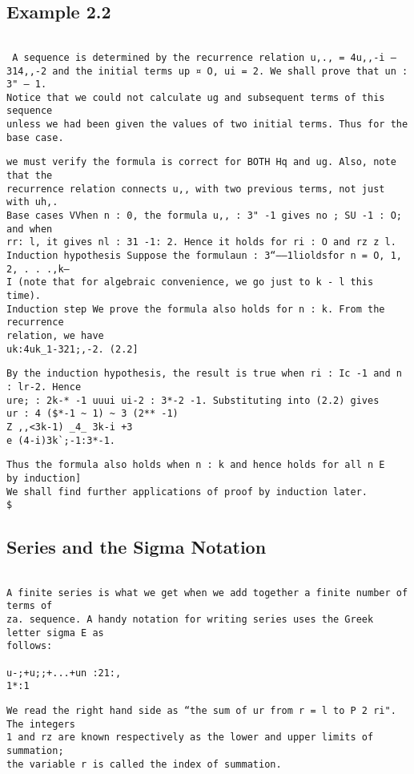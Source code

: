 \documentclass[]{article}
\begin{document}
\subsection*{Example 2.2}
\begin{verbatim}

 A sequence is determined by the recurrence relation u,., = 4u,,-i —
314,,-2 and the initial terms up ¤ O, ui = 2. We shall prove that un : 3" — 1.
Notice that we could not calculate ug and subsequent terms of this sequence
unless we had been given the values of two initial terms. Thus for the base case.
\end{verbatim}
\begin{verbatim}
we must verify the formula is correct for BOTH Hq and ug. Also, note that the
recurrence relation connects u,, with two previous terms, not just with uh,.
Base cases VVhen n : 0, the formula u,, : 3" -1 gives no ; SU -1 : O; and when
rr: l, it gives nl : 31 -1: 2. Hence it holds for ri : O and rz z l.
Induction hypothesis Suppose the formulaun : 3“——1lioldsfor n = O, 1, 2, . . .,k—
I (note that for algebraic convenience, we go just to k - l this time).
Induction step We prove the formula also holds for n : k. From the recurrence
relation, we have
uk:4uk_1-321;,-2. (2.2]
\end{verbatim}
\begin{verbatim}
By the induction hypothesis, the result is true when ri : Ic -1 and n : lr-2. Hence
ure; : 2k-* -1 uuui ui-2 : 3*-2 -1. Substituting into (2.2) gives
ur : 4 ($*-1 ~ 1) ~ 3 (2** -1)
Z ,,<3k-1) _4_ 3k-i +3
e (4-i)3k`;-1:3*-1.
\end{verbatim}
\begin{verbatim}
Thus the formula also holds when n : k and hence holds for all n E   by induction]
We shall find further applications of proof by induction later.
$
\end{verbatim}
\subsection*{Series and the Sigma Notation}
\begin{verbatim}

A finite series is what we get when we add together a finite number of terms of
za. sequence. A handy notation for writing series uses the Greek letter sigma E as
follows:
 
u-;+u;;+...+un :21:,
1*:1
\end{verbatim}
\begin{verbatim}
We read the right hand side as “the sum of ur from r = l to P 2 ri". The integers
1 and rz are known respectively as the lower and upper limits of summation;
the variable r is called the index of summation.
\end{verbatim}
\end{document}
